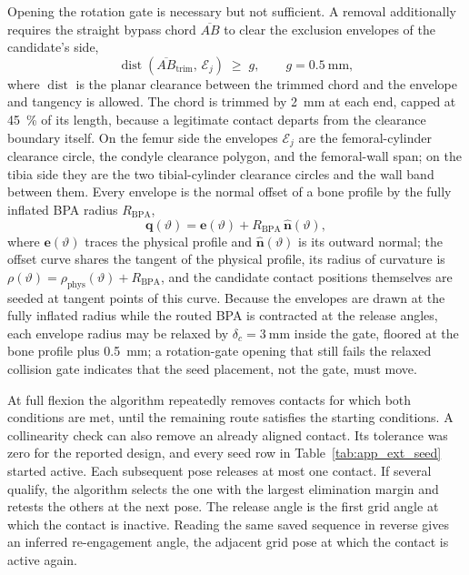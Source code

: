 Opening the rotation gate is necessary but not sufficient. A removal additionally requires the straight bypass chord $\overline{AB}$ to clear the exclusion envelopes of the candidate's side,
\begin{equation}
\operatorname{dist}\!\left(\overline{AB}_{\mathrm{trim}},\, \mathcal{E}_{j}\right) \;\geq\; g, \qquad g = \qty{0.5}{\mm},
\label{eq:app_bypass_gate}
\end{equation}
where $\operatorname{dist}$ is the planar clearance between the trimmed chord and the envelope and tangency is allowed. The chord is trimmed by \qty{2}{\mm} at each end, capped at \qty{45}{\percent} of its length, because a legitimate contact departs from the clearance boundary itself. On the femur side the envelopes $\mathcal{E}_{j}$ are the femoral-cylinder clearance circle, the condyle clearance polygon, and the femoral-wall span; on the tibia side they are the two tibial-cylinder clearance circles and the wall band between them. Every envelope is the normal offset of a bone profile by the fully inflated BPA radius $R_{\mathrm{BPA}}$,
\begin{equation}
\mathbf{q}(\vartheta) = \mathbf{e}(\vartheta) + R_{\mathrm{BPA}}\,\hat{\mathbf{n}}(\vartheta),
\label{eq:app_offset_curve}
\end{equation}
where $\mathbf{e}(\vartheta)$ traces the physical profile and $\hat{\mathbf{n}}(\vartheta)$ is its outward normal; the offset curve shares the tangent of the physical profile, its radius of curvature is $\rho(\vartheta) = \rho_{\mathrm{phys}}(\vartheta) + R_{\mathrm{BPA}}$, and the candidate contact positions themselves are seeded at tangent points of this curve. Because the envelopes are drawn at the fully inflated radius while the routed BPA is contracted at the release angles, each envelope radius may be relaxed by $\delta_c = \qty{3}{\mm}$ inside the gate, floored at the bone profile plus \qty{0.5}{\mm}; a rotation-gate opening that still fails the relaxed collision gate indicates that the seed placement, not the gate, must move.

At full flexion the algorithm repeatedly removes contacts for which both conditions are met, until the remaining route satisfies the starting conditions. A collinearity check can also remove an already aligned contact. Its tolerance was zero for the reported design, and every seed row in Table~\ref{tab:app_ext_seed} started active. Each subsequent pose releases at most one contact. If several qualify, the algorithm selects the one with the largest elimination margin and retests the others at the next pose. The release angle is the first grid angle at which the contact is inactive. Reading the same saved sequence in reverse gives an inferred re-engagement angle, the adjacent grid pose at which the contact is active again.

